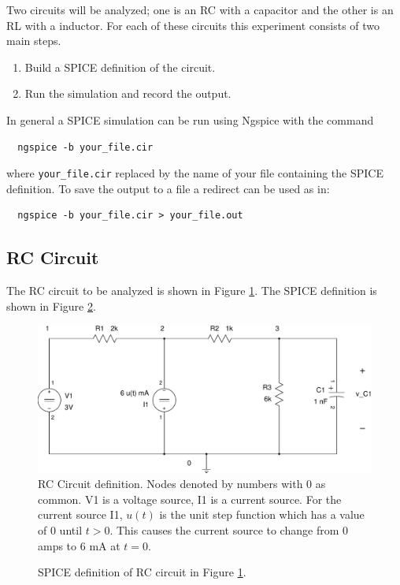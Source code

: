 \documentclass{article}
\begin{document}
Two circuits will be analyzed; one is an RC with a capacitor and
the other is an RL with a inductor.
For each of these circuits this experiment consists of two main steps.
\begin{enumerate}
\item Build a SPICE definition of the circuit.
\item Run the simulation and record the output.
\end{enumerate}

In general a SPICE simulation can be run using Ngspice with the command
\begin{verbatim}
  ngspice -b your_file.cir
\end{verbatim}
where \verb+your_file.cir+ replaced by the name of your file
containing the SPICE definition.
To save the output to a file a redirect can be used as in:
\begin{verbatim}
  ngspice -b your_file.cir > your_file.out
\end{verbatim}

\subsection{RC Circuit}

The RC circuit to be analyzed is shown in Figure \ref{fig:rccircuit}.
The SPICE definition is shown in Figure \ref{fig:spice_rc}.

\begin{figure}[!hbtp]
\center
\includegraphics[scale=0.5]{spice/rc_circuit-01}
\caption{RC Circuit definition.
Nodes denoted by numbers with 0 as common.
V1 is a voltage source, I1 is a current source.
For the current source I1, $u(t)$ is the unit step function
which has a value of $0$ until $t > 0$.
This causes the current source to change from 0 amps to 6 mA at $t = 0$.
}
\label{fig:rccircuit}
\end{figure}

\begin{figure}[!hbtp]

\caption{SPICE definition of RC circuit in Figure \ref{fig:rccircuit}.}
\label{fig:spice_rc}
\end{figure}
\end{document}
